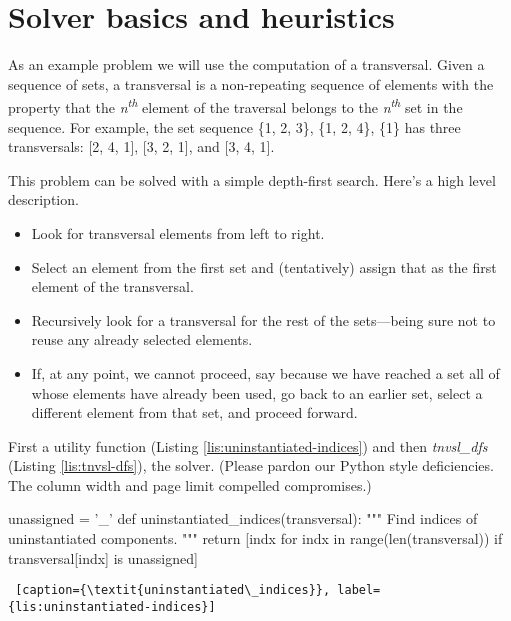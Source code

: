 \section{Solver basics and heuristics} \label{sec:solver-basics}

As an example problem we will use the computation of a transversal. Given a sequence of sets, a transversal is a non-repeating sequence of elements with the property that the \textit{n\textsuperscript{th}} element of the traversal belongs to the \textit{n\textsuperscript{th}} set in the sequence. For example, the set sequence \{1, 2, 3\}, \{1, 2, 4\}, \{1\} has three transversals: [2, 4, 1], [3, 2, 1], and [3, 4, 1]. 

This problem can be solved with a simple depth-first search. Here's a high level description. 
\begin{itemize}
    \item Look for transversal elements from left to right.
    \item Select an element from the first set and (tentatively) assign that as the first element of the transversal.
    \item Recursively look for a transversal for the rest of the sets---being sure not to reuse any already selected elements.
    \item If, at any point, we cannot proceed, say because we have reached a set all of whose elements have already been used, go back to an earlier set, select a different element from that set, and proceed forward.
\end{itemize}

First a utility function (Listing \ref{lis:uninstantiated-indices}) and then \textit{tnvsl\_dfs} (Listing \ref{lis:tnvsl-dfs}), the solver. (Please pardon our Python style deficiencies. The column width and page limit compelled compromises.) 


\begin{center}
\begin{minipage}[c]{0.45\textwidth}
\begin{python1}  
unassigned = '_'
def uninstantiated_indices(transversal):
  """ Find indices of uninstantiated components. """
  return [indx for indx in range(len(transversal)) 
               if transversal[indx] is unassigned]
\end{python1}\linv
\begin{lstlisting} [caption={\textit{uninstantiated\_indices}}, label={lis:uninstantiated-indices}]
\end{lstlisting}
\end{minipage}
\end{center}

